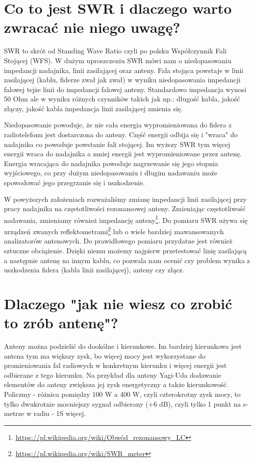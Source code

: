 \documentclass[a4paper,12pt]{article}
\begin{document}
\section{Co to jest SWR i dlaczego warto zwracać nie niego uwagę?}
SWR to skrót od Standing Wave Ratio czyli po polsku Współczynnik Fali Stojącej (WFS). W dużym uproszczeniu SWR mówi nam o niedopasowaniu impedancji nadajnika, linii zasilającej oraz anteny. Fala stojąca powstaje w linii zasilającej (kablu, fiderze zwał jak zwał) w wyniku niedopasowania impedancji falowej tejże linii do impedancji falowej anteny. Standardowo impedancja wynosi 50 Ohm ale w wyniku różnych czynników takich jak np.: długość kabla, jakość złączy, jakość kabla impedancja linii zasilającej zmienia się. 

Niedopasowanie powoduje, że nie cała energia wypromieniowana do fidera z radiotelefonu jest dostarczona do anteny. Część energii odbija się i "wraca" do nadajnika co powoduje powstanie fali stojącej. Im wyższy SWR tym więcej energii wraca do nadajnika a mniej energii jest wypromieniowane przez antenę. Energia wracająca do nadajnika powoduje nagrzewanie się jego stopnia wyjściowego, co przy dużym niedopasowaniu i długim nadawaniu może spowodować jego przegrzanie się i uszkodzenie.

W powyższych założeniach rozważaliśmy zmianę impedancji linii zasilającej przy pracy nadajnika na częstotliwości rezonansowej anteny. Zmieniając częstotliwość nadawania, zmieniamy również impedancję anteny\footnote{\url{https://pl.wikipedia.org/wiki/Obwód_rezonansowy_LC}}.
Do pomiaru SWR używa się urządzeń zwanych reflektometrami\footnote{\url{https://pl.wikipedia.org/wiki/SWR_meter}} lub o wiele bardziej zaawansowanych analizatorów antenowych.
Do prawidłowego pomiaru przydatne jest również sztuczne obciążenie. Dzięki niemu możemy najpierw przetestować linię zasilającą a następnie antenę na innym kablu, co pozwala nam ocenić czy problem wynika z uszkodzenia fidera (kabla linii zasilającej), anteny czy złącz.

\section{Dlaczego "jak nie wiesz co zrobić to zrób antenę"?}
Anteny można podzielić do dookólne i kierunkowe. Im bardziej kierunkowa jest antena tym ma większy zysk, bo więcej mocy jest wykorzystane do promieniowania fal radiowych w konkretnym kierunku i więcej energii jest odbierane z tego kierunku. Na przykład dla anteny Yagi-Uda dodawanie elementów do anteny zwiększa jej zysk energetyczny a także kierunkowość.
Policzmy - różnica pomiędzy 100 W a 400 W, czyli czterokrotny zysk mocy, to tylko dwukrotnie mocniejszy sygnał odbierany (+6 dB), czyli tylko 1 punkt na s-metrze w radiu - 1S więcej. 
\end{document}
